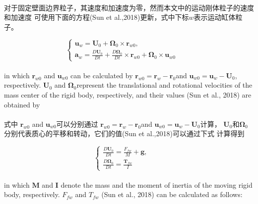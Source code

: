 \documentclass[UTF8]{ctexart}
\begin{document}
\paragraph{\quad}对于固定壁面边界粒子，其速度和加速度为零，然而本文中的运动刚体粒子的速度和加速度
            可使用下面的方程(Sun et al.,2018)更新，式中下标$w$表示运动缸体粒子。

\begin{equation}
   \begin{cases} \mathbf{u}_w =  \mathbf{U}_0 + \mathbf{\Omega}_0 \times \mathbf{r}_{w0}, \\
   \mathbf{a}_w = \frac{D \mathbf{U}_0}{Dt}+\frac{D \mathbf{\Omega}_0}{Dt}\times\mathbf{r}_{w0}+\mathbf{\Omega}_0\times\mathbf{u}_{w0} \end{cases} \qquad 
\end{equation}

\paragraph{\quad}in which $\mathbf{r}_{w0}$ and $\mathbf{u}_{w0}$ can be calculated by
             $\mathbf{r}_{w0} = \mathbf{r}_w-\mathbf{r}_0 $and $\mathbf{u}_{w0} = \mathbf{u}_w-\mathbf{U}_0$, 
                respectively. $\mathbf{U}_0$ and $\mathbf{\Omega}_0$represent the translational and rotational 
                velocities of the mass center of the rigid body, respectively, and 
                their values (Sun et al., 2018) are obtained by
\paragraph{\quad}式中 $\mathbf{r}_{w0}$ and $\mathbf{u}_{w0}$可以分别通过
                    $\mathbf{r}_{w0} = \mathbf{r}_w-\mathbf{r}_0 $and $\mathbf{u}_{w0} = \mathbf{u}_w-\mathbf{U}_0$计算，
                    $\mathbf{U}_0$和$\mathbf{\Omega}_0$分别代表质心的平移和转动，它们的值(Sun et al.,2018)可以通过下式
                    计算得到

\begin{equation}
   \begin{cases} \frac{D \mathbf{U}_0}{Dt}=\frac{F_{fw}}{M}+\mathbf{g}, \\
   \frac{D \mathbf{\Omega}_0}{Dt} = \frac{\mathbf{T}_{fw}}{I} \end{cases} \qquad 
\end{equation}

\paragraph{\quad}in which $\mathbf{M}$ and $\mathbf{I}$ denote the mass and the moment of 
                inertia of the moving rigid body, 
                respectively. $F_{fw}$ and $T_{fw}$ (Sun et al., 2018) can be calculated as follows:
\end{document}
